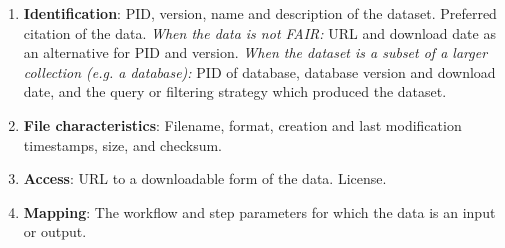 \begin{enumerate}[label=\textbf{D\arabic*}]
    \item \textbf{Identification}: PID, version, name and description of the dataset. Preferred citation of the data. \emph{When the data is not FAIR:} URL and download date as an alternative for PID and version. \emph{When the dataset is a subset of a larger collection (e.g. a database):} PID of database, database version and download date, and the query or filtering strategy which produced the dataset. \label{renske:req:data_id}
    \item \textbf{File characteristics}: Filename, format, creation and last modification timestamps, size, and checksum. \label{renske:req:data_char}
    \item \textbf{Access}: URL to a downloadable form of the data. License. \label{renske:req:data_access}
    \item \label{renske:req:data_mapping} \textbf{Mapping}: The workflow and step parameters for which the data is an input or output.
\end{enumerate}
